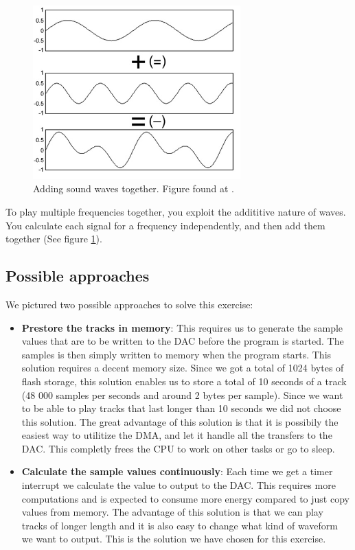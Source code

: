 \begin{figure}[h]
	\centering
	\includegraphics[width=8cm]{img/sumofsines.jpg}
	\caption{Adding sound waves together. Figure found at \cite{fourier}.}
	\label{fig:adding_waves}
\end{figure}
To play multiple frequencies together, you exploit the addititive nature of waves. You calculate each signal for a frequency independently, and then add them together (See figure \ref{fig:adding_waves}).

\subsection{Possible approaches}
We pictured two possible approaches to solve this exercise:

\begin{itemize}
	\item \textbf{Prestore the tracks in memory}: This requires us to generate the sample values that are to be written to the DAC before the program is started. The samples is then simply written to memory when the program starts. This solution requires a decent memory size. Since we got a total of 1024 bytes of flash storage, this solution enables us to store a total of 10 seconds of a track (48 000 samples per seconds and around 2 bytes per sample). Since we want to be able to play tracks that last longer than 10 seconds we did not choose this solution. The great advantage of this solution is that it is possibily the easiest way to utilitize the DMA, and let it handle all the transfers to the DAC. This completly frees the CPU to work on other tasks or go to sleep.
	\item \textbf{Calculate the sample values continuously}: Each time we get a timer interrupt we calculate the value to output to the DAC. This requires more computations and is expected to consume more energy compared to just copy values from memory. The advantage of this solution is that we can play tracks of longer length and it is also easy to change what kind of waveform we want to output. This is the solution we have chosen for this exercise.
	   
\end{itemize}

